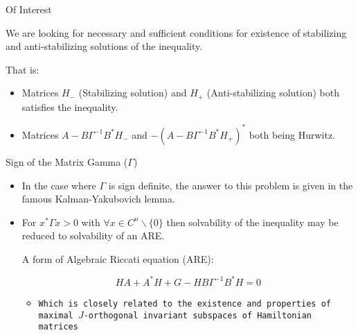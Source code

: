 \begin{frame}{Of Interest}

We are looking for necessary and sufficient conditions for existence of stabilizing and anti-stabilizing solutions of the inequality.
 
	\begin{block}{That is: }
    
    \begin{itemize}
\item Matrices $H_{-}$ (Stabilizing solution) and $H_{+}$ (Anti-stabilizing solution) both satisfies the inequality.
\item Matrices $A-B\Gamma^{-1}B^{*}H_{-}$ and $-(A-B\Gamma^{-1}B^{*}H_{+})^{*}$ both being Hurwitz.
	\end{itemize}

\end{block}

\end{frame}
\begin{frame}{Sign of the Matrix Gamma ($\Gamma$)}

\begin{itemize}

\item In the case where $\Gamma$ is sign definite, the answer to this problem is given in the famous Kalman-Yakubovich lemma.



\item For $x^{*}\Gamma x>0$ with $\forall x \in C^{n}\backslash \{0\}$ then solvability of the inequality may be reduced to solvability of an ARE.



\begin{block}{A form of Algebraic Riccati equation (ARE): }

\begin{equation*}
HA + A^{*}H + G - HB\Gamma ^{-1}B^{*}H = 0
\end{equation*}

\end{block}
\begin{itemize}
\item \texttt{Which is closely related to the existence and properties of maximal $J$-orthogonal invariant subspaces of Hamiltonian matrices}
\end{itemize}

\end{itemize}

\end{frame}



